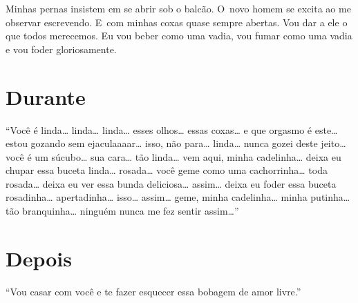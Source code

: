 Minhas pernas insistem em se abrir sob o balcão. O~novo homem se excita
ao me observar escrevendo. E~com minhas coxas quase sempre abertas. Vou
dar a ele o que todos merecemos. Eu vou beber como uma vadia, vou fumar
como uma vadia e vou foder gloriosamente.

\chapter{Durante}

``Você é linda… linda… linda… esses olhos…
essas coxas… e que orgasmo é este… estou gozando sem
ejaculaaaar… isso, não para… linda… nunca gozei
deste jeito… você é um súcubo… sua cara… tão
linda… vem aqui, minha cadelinha… deixa eu chupar essa
buceta linda… rosada… você geme como uma
cachorrinha… toda rosada… deixa eu ver essa bunda
deliciosa… assim… deixa eu foder essa buceta
rosadinha… apertadinha… isso… assim… geme,
minha cadelinha… minha putinha… tão branquinha…
ninguém nunca me fez sentir assim…''

\chapter{Depois}

``Vou casar com você e te fazer esquecer essa bobagem de amor livre.''

\paginabranca{} 

\paginabranca{} 
